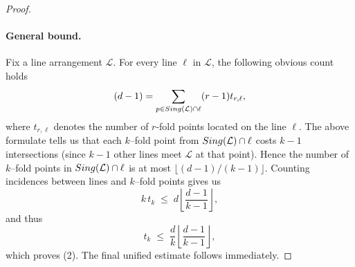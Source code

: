 \documentclass[10pt,a4paper]{amsart}
\newcommand{\LL}{\mathcal{L}}
\begin{document}
\begin{proof}
\paragraph{General bound.}
Fix a line arrangement $\LL$. For every line $\ell$ in $\LL$, the following obvious count holds
\[(d-1) = \sum_{p \in {\rm Sing}(\mathcal{L}) \cap \ell} (r-1)t_{r,\ell},\]
where $t_{r,\ell}$ denotes the number of $r$-fold points located on the line $\ell$.
The above formulate tells us that each $k$--fold point from ${\rm Sing}(\mathcal{L}) \cap \ell$ costs $k-1$ intersections (since $k-1$ other lines meet $\LL$ at that point). Hence the number of $k$--fold points in ${\rm Sing}(\mathcal{L}) \cap \ell$ is at most $\lfloor (d-1)/(k-1)\rfloor$.
Counting incidences between lines and $k$--fold points gives us
\[
k\,t_k \;\le\; d\left\lfloor\frac{d-1}{k-1}\right\rfloor,
\]
and thus
\[
t_k \;\le\; \frac{d}{k}\left\lfloor\frac{d-1}{k-1}\right\rfloor,
\]
which proves (2). The final unified estimate follows immediately.
\end{proof}
\end{document}
